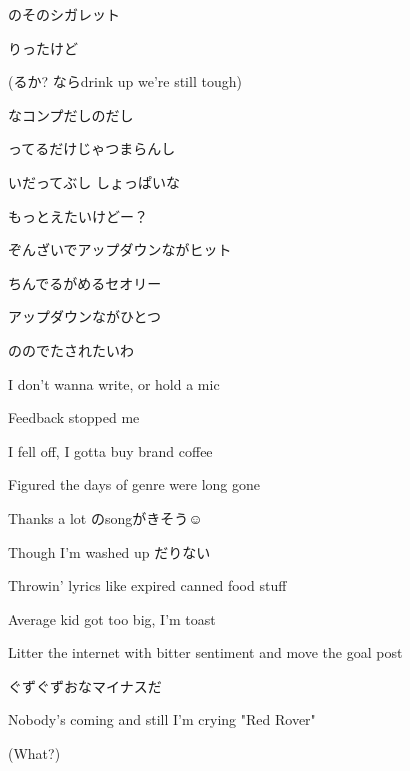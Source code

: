 \documentclass[a4paper,tate,twocolumn,12pt]{ltjtarticle}
\begin{document}
\begin{flushleft}
\begin{minipage}{\linewidth}
のそのシガレット

りったけど

(るか? ならdrink up we're still tough)

なコンプだしのだし

ってるだけじゃつまらんし

いだってぶし しょっぱいな

もっとえたいけどー？
\end{minipage}

\vspace{2em}

\noindent\begin{minipage}{\linewidth}
ぞんざいでアップダウンながヒット

ちんでるがめるセオリー

アップダウンながひとつ

ののでたされたいわ
\end{minipage}

\vspace{2em}

\noindent\begin{minipage}{\linewidth}
I don't wanna write, or hold a mic

Feedback stopped me

I fell off, I gotta buy brand coffee

Figured the days of genre were long gone

Thanks a lot のsongがきそう☺

Though I'm washed up だりない

Throwin' lyrics like expired canned food stuff

Average kid got too big, I'm toast

Litter the internet with bitter sentiment and move the goal post

ぐずぐずおなマイナスだ

Nobody's coming and still I'm crying "Red Rover"

(What?)


\end{minipage}
\end{flushleft}
\end{document}
